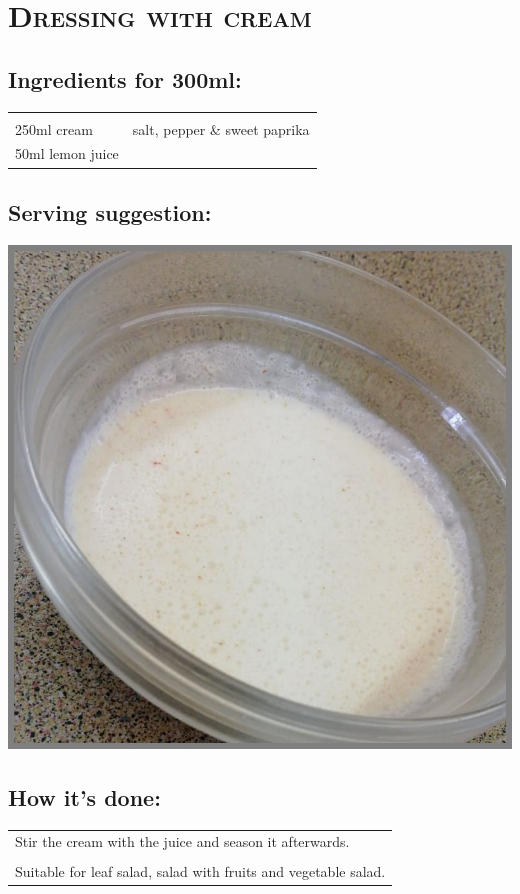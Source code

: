 \section{\textsc{Dressing with cream}}

\subsection*{Ingredients for 300ml:}

\begin{tabular}{p{7.5cm} p{7.5cm}}
	& \\
	250ml cream & salt, pepper \& sweet paprika \\
	50ml lemon juice & 
\end{tabular}

\subsection*{Serving suggestion:}

\includegraphics[width=\textwidth]{img/d_sahne.jpeg} \cite{dsahne}

\subsection*{How it's done:}

\begin{tabular}{p{15cm}}
	\\
	Stir the cream with the juice and season it afterwards.\\
	\\
	Suitable for leaf salad, salad with fruits and vegetable salad.
\end{tabular}
